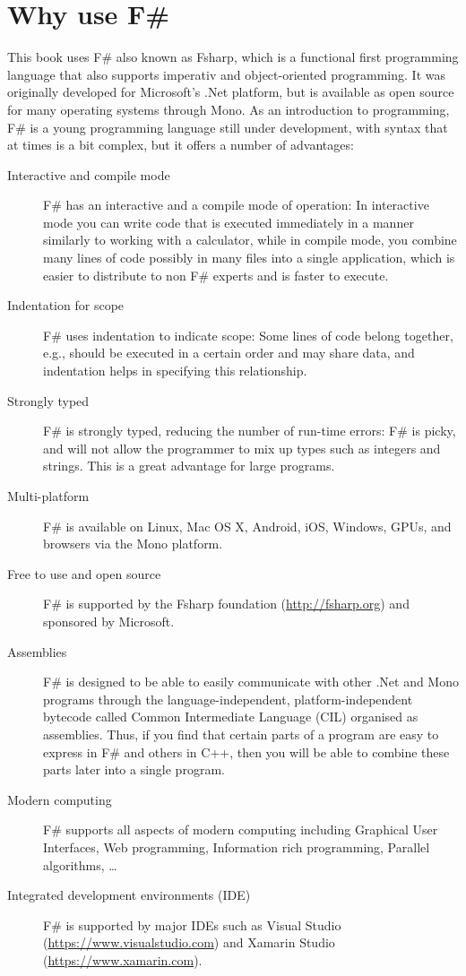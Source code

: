\section{Why use F\#}
This book uses F\# also known as Fsharp, which is a functional first programming language that also supports imperativ and object-oriented programming. It was originally developed for Microsoft's .Net platform, but is available as open source for many operating systems through Mono. As an introduction to programming, F\# is a young programming language still under development, with syntax that at times is a bit complex, but it offers a number of advantages:
\begin{description}
\item[Interactive and compile mode] F\# has an interactive and a compile mode of operation: In interactive mode you can write code that is executed immediately in a manner similarly to working with a calculator, while in compile mode, you combine many lines of code possibly in many files into a single application, which is easier to distribute to non F\# experts and is faster to execute.
\item[Indentation for scope] F\# uses indentation to indicate scope: Some lines of code belong together, e.g., should be executed in a certain order and may share data, and indentation helps in specifying this relationship.
\item[Strongly typed] F\# is strongly typed, reducing the number of run-time errors: F\# is picky, and will not allow the programmer to mix up types such as integers and strings. This is a great advantage for large programs.
\item[Multi-platform] F\# is available on Linux, Mac OS X, Android, iOS, Windows, GPUs, and browsers via the Mono platform.
\item[Free to use and open source] F\# is supported by the Fsharp foundation (\url{http://fsharp.org}) and sponsored by Microsoft.
\item[Assemblies] F\# is designed to be able to easily communicate with other .Net and Mono programs through the language-independent, platform-independent bytecode called Common Intermediate Language (CIL) organised as assemblies. Thus, if you find that certain parts of a program are easy to express in F\# and others in C++, then you will be able to combine these parts later into a single program.
\item[Modern computing] F\# supports all aspects of modern computing including Graphical User Interfaces, Web programming, Information rich programming, Parallel algorithms, \dots
\item[Integrated development environments (IDE)] F\# is supported by major IDEs such as Visual Studio (\url{https://www.visualstudio.com}) and Xamarin Studio (\url{https://www.xamarin.com}).
\end{description}

